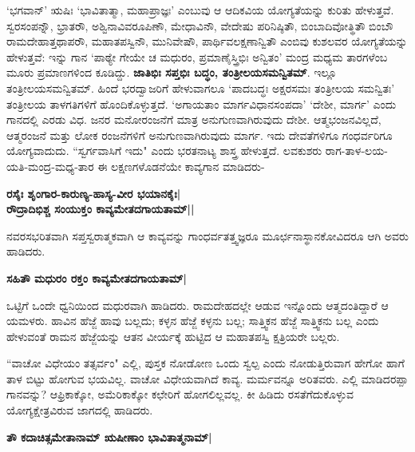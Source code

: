 `ಭಗವಾನ್‍' ಋಷಿಃ `ಭಾವಿತಾತ್ಮಾ, ಮಹಾಪ್ರಾಜ್ಞಃ' ಎಂಬುವು ಆ ಆದಿಕವಿಯ ಯೋಗ್ಯತೆಯನ್ನು ಕುರಿತು ಹೇಳುತ್ತವೆ. ಸ್ವರಸಂಪನ್ನೌ, ಭ್ರಾತರೌ, ಅಶ್ವಿನಾವಿವರೂಪಿಣೌ, ಮೇಧಾವಿನೌ, ವೇದೇಷು ಪರಿನಿಷ್ಠಿತೌ, ಬಿಂಬಾದಿವೋತ್ಥಿತೌ ಬಿಂಬೌ ರಾಮದೇಹಾತ್ತಥಾಪರೌ, ಮಹಾತಪಸ್ವಿನೌ, ಮುನಿವೇಷೌ, ಪಾರ್ಥಿವಲಕ್ಷಣಾನ್ವಿತೌ ಎಂಬಿವು ಕುಶಲವರ ಯೋಗ್ಯತೆಯನ್ನು ಹೇಳುತ್ತವೆ: ಇನ್ನು ಗಾನ `ಪಾಠ್ಯೇ ಗೇಯೇ ಚ ಮಧುರಂ, ಪ್ರಮಾಣೈಸ್ತ್ರಿಭಿಃ ಅನ್ವಿತಂ' ಮಂದ್ರ ಮಧ್ಯಮ ತಾರಗಳೆಂಬ ಮೂರು ಪ್ರಮಾಣಗಳಿಂದ ಕೂಡಿದ್ದು. {\bf ಜಾತಿಭಿಃ ಸಪ್ತಭಿಃ ಬದ್ಧಂ, ತಂತ್ರೀಲಯಸಮನ್ವಿತಮ್‍}. ಇಲ್ಲೂ ತಂತ್ರೀಲಯಸಮನ್ವಿತಮ್‍. ಹಿಂದೆ ಭರದ್ವಾಜರಿಗೆ ಹೇಳುವಾಗಲೂ `ಪಾದಬದ್ಧಃ ಅಕ್ಷರಸಮಃ ತಂತ್ರೀಲಯ ಸಮನ್ವಿತಃ' ತಂತ್ರೀಲಯ ತಾಳಗತಿಗಳಿಗೆ ಹೊಂದಿಕೊಳ್ಳುತ್ತದೆ. `ಅಗಾಯತಾಂ ಮಾರ್ಗವಿಧಾನಸಂಪದಾ' `ದೇಶೀ, ಮಾರ್ಗ' ಎಂದು ಗಾನದಲ್ಲಿ ಎರಡು ವಿಧ. ಜನರ ಮನೋರಂಜನೆಗೆ ಮಾತ್ರ ಅನುಗುಣವಾಗಿರುವುದು ದೇಶೀ. ಆತ್ಮಭಂಜನವಿಲ್ಲದೆ, ಆತ್ಮರಂಜನೆ ಮತ್ತು ಲೋಕ ರಂಜನೆಗಳಿಗೆ ಅನುಗುಣವಾಗಿರುವುದು ಮಾರ್ಗ. ಇದು ದೇವತೆಗಳಿಗೂ ಗಂಧರ್ವರಿಗೂ ಯೋಗ್ಯವಾದುದು. ``ಸ್ವರ್ಗವಾಸಿಗೆ ಇದು" ಎಂದು ಭರತನಾಟ್ಯ ಶಾಸ್ತ್ರ ಹೇಳುತ್ತದೆ. ಲವಕುಶರು ರಾಗ-ತಾಳ-ಲಯ-ಯತಿ-ಮಂದ್ರ-ಮಧ್ಯ-ತಾರ ಈ ಲಕ್ಷಣಗಳೊಡನೆಯೇ ಕಾವ್ಯಗಾನ ಮಾಡಿದರು- 


\begin{center} 

{\bf ರಸೈಃ ಶೃಂಗಾರ-ಕಾರುಣ್ಯ-ಹಾಸ್ಯ-ವೀರ ಭಯಾನಕೈಃ|\\ 

ರೌದ್ರಾದಿಭಿಶ್ಚ ಸಂಯುಕ್ತಂ ಕಾವ್ಯಮೇತದಗಾಯತಾಮ್‍||} 

\end{center} 


ನವರಸಭರಿತವಾಗಿ ಸಪ್ತಸ್ವರಾತ್ಮಕವಾಗಿ ಆ ಕಾವ್ಯವನ್ನು ಗಾಂಧರ್ವತತ್ತ್ವಜ್ಞರೂ ಮೂರ್ಛನಾಸ್ಥಾನಕೋವಿದರೂ ಆಗಿ ಅವರು ಹಾಡಿದರು. 


\begin{center} 

{\bf ಸಹಿತೌ ಮಧುರಂ ರಕ್ತಂ ಕಾವ್ಯಮೇತದಗಾಯತಾಮ್‍|} 

\end{center} 


ಒಟ್ಟಿಗೆ ಒಂದೇ ಧ್ವನಿಯಿಂದ ಮಧುರವಾಗಿ ಹಾಡಿದರು. ರಾಮದೇಹದಲ್ಲೇ ಆಡುವ ಇನ್ನೊಂದು ಆತ್ಮದಂತಿದ್ದಾರೆ ಆ ಯಮಳರು. ಹಾವಿನ ಹೆಜ್ಜೆ ಹಾವು ಬಲ್ಲದು; ಕಳ್ಳನ ಹೆಜ್ಜೆ ಕಳ್ಳನು ಬಲ್ಲ; ಸಾತ್ತ್ವಿಕನ ಹೆಜ್ಜೆ ಸಾತ್ತ್ವಿಕನು ಬಲ್ಲ ಎಂದು ಹೇಳುವಂತೆ ರಾಮನ ಹೆಜ್ಜೆಯನ್ನು ಆತನ ವೀರ್ಯಕ್ಕೆ ಹುಟ್ಟಿದ ಆ ಮಹಾತಪಸ್ವಿ ಕ್ಷತ್ರಿಯರೇ ಬಲ್ಲರು. 


``ವಾಚೋ ವಿಧೇಯಂ ತತ್ಸರ್ವಂ" ಎಲ್ಲಿ, ಪುಸ್ತಕ ನೋಡೋಣ ಒಂದು ಸ್ವಲ್ಪ ಎಂದು ನೋಡುತ್ತಿರುವಾಗ ಹೇಗೋ ಹಾಗೆ ತಾಳ ಬಿಟ್ಟು ಹೋಗುವ ಭಯವಿಲ್ಲ. ವಾಚೋ ವಿಧೇಯವಾಗಿದೆ ಕಾವ್ಯ. ಮರ್ಮವನ್ನೂ ಅರಿತವರು. ಎಲ್ಲಿ ಮಾಡಿದರಪ್ಪಾ ಗಾನವನ್ನು? ಆಫ್ರಿಕಾಕ್ಕೋ, ಅಮೆರಿಕಾಕ್ಕೋ ಕಛೇರಿಗೆ ಹೋಗಲಿಲ್ಲವಲ್ಲ. ಕೀ ಹಿಡಿದು ರಸತೆಗೆದುಕೊಳ್ಳುವ ಯೋಗ್ಯಕ್ಷೇತ್ರವಿರುವ ಜಾಗದಲ್ಲಿ ಹಾಡಿದರು. 


\begin{center} 

{\bf ತೌ ಕದಾಚಿತ್ಸಮೇತಾನಾಮ್‍ ಋಷೀಣಾಂ ಭಾವಿತಾತ್ಮನಾಮ್‍|} 

\end{center} 


